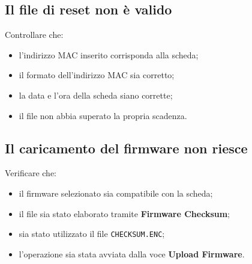\documentclass[11pt,a4paper]{article}
\newcommand{\button}[1]{\textbf{#1}}
\newcommand{\filename}[1]{\texttt{#1}}
\begin{document}
\subsection{Il file di reset non è valido}

Controllare che:

\begin{itemize}
    \item l'indirizzo MAC inserito corrisponda alla scheda;
    \item il formato dell'indirizzo MAC sia corretto;
    \item la data e l'ora della scheda siano corrette;
    \item il file non abbia superato la propria scadenza.
\end{itemize}

\subsection{Il caricamento del firmware non riesce}

Verificare che:

\begin{itemize}
    \item il firmware selezionato sia compatibile con la scheda;
    \item il file sia stato elaborato tramite
    \button{Firmware Checksum};
    \item sia stato utilizzato il file \filename{CHECKSUM.ENC};
    \item l'operazione sia stata avviata dalla voce
    \button{Upload Firmware}.
\end{itemize}
\end{document}
